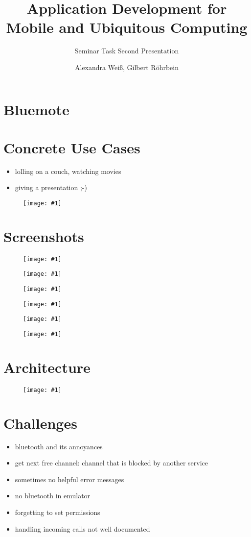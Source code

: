 \documentclass[ddc nogerman]{tudbeamer}
\newcommand{\imageframe}[1]{
    \begin{frame}
        \begin{figure}
            \centering
            \texttt{[image: \#1]}
        \end{figure}
    \end{frame}
}
\begin{document}

\title{Application Development for Mobile and Ubiquitous Computing}
\subtitle{Seminar Task Second Presentation}
\author{Alexandra Weiß, Gilbert Röhrbein}

\maketitle

\section{Bluemote}
\begin{frame}
\end{frame}

\section{Concrete Use Cases}
\begin{frame}
    \begin{itemize}
        \item lolling on a couch, watching movies
        \item giving a presentation ;-)
    \end{itemize}
\end{frame}

\imageframe{img/use-case-vlc.jpg}

\section{Screenshots}
\imageframe{img/btactivate.png}
\imageframe{img/btauth.png}
\imageframe{img/choosedevice.png}
\imageframe{img/choosefunction.png}
\imageframe{img/presentation.png}
\imageframe{img/vlc.png}

\section{Architecture}
\imageframe{img/components.pdf}

\section{Challenges}
\begin{frame}
    \begin{itemize}
        \item bluetooth and its annoyances
    	\item get next free channel: channel that is blocked by another service
    	\item sometimes no helpful error messages
        \item no bluetooth in emulator
        \item forgetting to set permissions
        \item handling incoming calls not well documented
    \end{itemize}
\end{frame}
\end{document}

